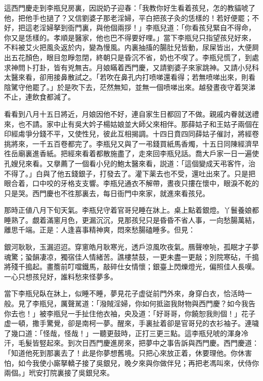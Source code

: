 這西門慶走到李瓶兒房裏，因説奶子迎春：「我教你好生看着孩兒，怎的教貓唬了他，把他手也撾了？又信劉婆子那老淫婦，平白把孩子灸的恁樣的！若好便罷；不好，把這老淫婦拏到衙門裏，與他個兩拶！」李瓶兒道：「你看孩兒緊自不得命，你又是恁樣的。孝順是醫家，他也巴不得要好哩。」當下李瓶兒只指望孩兒好來，不料被艾火把風灸返於内，變為慢風。内裏抽搐的腸肚兒皆動，尿屎皆出，大便屙出五花顏色，眼目忽睜忽閉，終朝只是昏沉不省，奶也不喫了。李瓶兒慌了，到處求神問卜打卦，皆有兇無吉。月娘瞞着西門慶，又請劉婆子來家跳神。又請小兒科太醫來看，卻用接鼻散試之。「若吹在鼻孔内打喷㖒還看得；若無喷㖒出來，則看陰騭守他罷了。」於是吹下去，茫然無知，並無一個喷㖒出來。越發晝夜守着哭涕不止，連飲食都減了。

看看到八月十五日將近，月娘因他不好，連自家生日都回了不做。親戚内眷就送禮來，也不請。家中止有吳大妗子楊姑娘並大師父來相伴。那薛姑子和王姑子兩個在印經䖏爭分錢不平，又使性兒，彼此互相揭調。十四日賁四同薛姑子催討，將經卷挑將來，一千五百卷都完了。李瓶兒又與了一弔錢買紙馬香燭，十五日同陳經濟早徃岳廟裏進香紙。把經來看着都散施盡了，走來回李瓶兒話。喬大戶家一日一遍使孔嫂兒來看。又擧薦了一個看小兒的鮑太醫來看，説道：「這個變成天弔客忤，治不得了。」白與了他五錢銀子，打發去了。灌下薬去也不受，還吐出來了。只是把眼合着，口中咬的牙格支支響。李瓶兒通衣不解帶，晝夜只摟在懷中，眼淚不乾的只是哭。西門慶也不徃那裏去，每日衙門中來家，就進來看孩兒。

那時正値八月下旬天氣。李瓶兒守着官哥兒睡在牀上。桌上點着銀燈。丫鬟養娘都睡熟了。覷着滿窻月色，更漏沉沉，見那孩兒只是昏昏不省人事，一向愁腸萬結，離思千端。正是：人逢喜事精神爽，悶來愁腸磕睡多。但見：

\begin{myquote}
銀河耿耿，玉漏迢迢。穿窻皓月耿寒光，透戶涼風吹夜氣。鴈聲嘹喨，孤眠才子夢魂驚；蛩韻凄凉，獨宿佳人情緒苦。譙樓禁鼓，一更未盡一更敲；別院寒砧，千搗將殘千搗起。畫簷前叮噹鐵馬，敲碎仕女情懷；銀臺上閃爍燈光，偏照佳人長嘆。一心只想孩兒好，誰料愁來怪夢多。
\end{myquote}

當下李瓶兒臥在牀上，似睡不睡，夢見花子虚従前門外來，身穿白衣，恰活時一般。見了李瓶兒，厲聲駡道：「潑賊淫婦，你如何抵盜我財物與西門慶？如今我告你去也！」被李瓶兒一手扯住他衣袖，央及道：「好哥哥，你饒恕我則個！」花子虚一頓，撒手驚覺，卻是南柯一夢。醒來，手裏扯着卻是官哥兒的衣衫袖子。連噦了幾口道：「怪哉，怪哉！」一聽更鼓時，正打三更三點。這李瓶兒唬的渾身冷汗，毛髮皆竪起來。到次日西門慶進房來，把夢中之事告訴與西門慶。西門慶道：「知道他死到那裏去了！此是你夢想舊境。只把心來放正着，休要理他。你休害怕，如今我使小廝拏轎子接了吳銀兒，晚夕來與你做伴兒；再把老馮叫來，伏侍你兩個。」玳安打院裏接了吳銀兒來。

